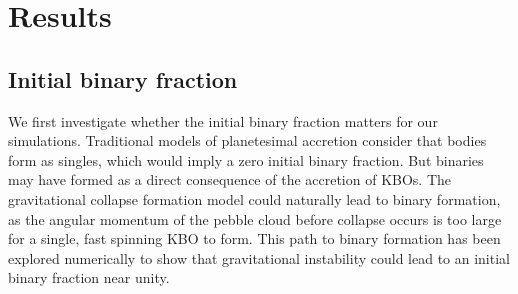 \documentclass[a4paper,12pt]{article}
\begin{document}


\section{Results}
\label{sec:results}

\subsection{Initial binary fraction}
\label{sec:resultInitialBinaryFraction}

We first investigate whether the initial binary fraction matters for our simulations. Traditional models of planetesimal accretion consider that bodies form as singles, which would imply a zero initial binary fraction. But binaries may have formed as a direct consequence of the accretion of KBOs.  The gravitational collapse formation model \cite{2005ApJ...620..459Y,2007Natur.448.1022J} could naturally lead to binary formation, as the angular momentum of the pebble cloud before collapse occurs is too large for a single, fast spinning KBO to form. This path to binary formation has been explored numerically \cite{2010AJ....140..785N} to show that gravitational instability could lead to an initial binary fraction near unity. 
\end{document}
